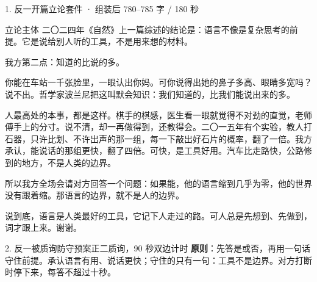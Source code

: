 \documentclass[script,con]{debate}
\begin{document}
\begin{kit}{1. 反一开篇立论}{套件 · 组装后 780–785 字 / 180 秒}
\begin{fixed}{立论主体}
二〇二四年《自然》上一篇综述的结论是：语言不像是复杂思考的前提。它是说给别人听的工具，不是用来想的材料。

我方第二点：知道的比说的多。

你能在车站一千张脸里，一眼认出你妈。可你说得出她的鼻子多高、眼睛多宽吗？说不出。哲学家波兰尼把这叫默会知识：我们知道的，比我们能说出来的多。

人最高处的本事，都是这样。棋手的棋感，医生看一眼就觉得不对劲的直觉，老师傅手上的分寸。说不清，却一再做得到，还教得会。二〇一五年有个实验，教人打石器，只许比划、不许出声的那一组，每一下敲出好石片的概率，翻了一倍。我方承认，能说话的那组更快，翻了四倍。可快，是工具好用。汽车比走路快，公路修到的地方，不是人类的边界。

所以我方全场会请对方回答一个问题：如果能，他的语言缩到几乎为零，他的世界没有跟着缩。那语言的边界，就不是人的边界。

说到底，语言是人类最好的工具，它记下人走过的路。可人总是先想到、先做到，词才跟上来。谢谢。
\end{fixed}
\end{kit}
\begin{contingency}
\end{contingency}

\begin{stage}{2. 反一被质询防守预案}{正二质询，90 秒双边计时}
\textbf{原则}：先答是或否，再用一句话守住前提。承认语言有用、说话更快；守住的只有一句：工具不是边界。对方打断时停下来，每答不超过十秒。
\begin{qa}
\end{qa}
\end{stage}
\end{document}
